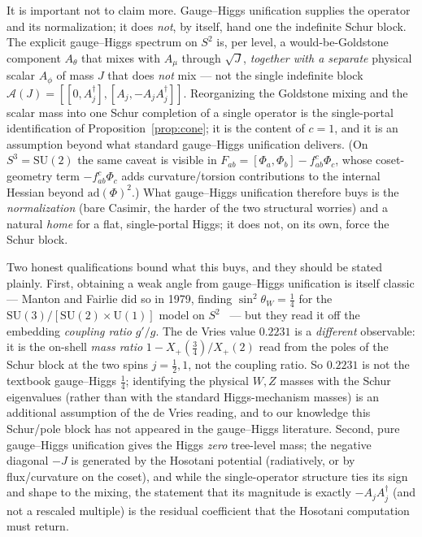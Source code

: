 \documentclass[11pt]{article}
\theoremstyle{plain}
\theoremstyle{definition}
\newcommand{\cA}{\mathcal{A}}
\newcommand{\sinsq}{\sin^{2}\theta_W}
\newcommand{\SU}{\mathrm{SU}}
\newcommand{\U}{\mathrm{U}}
\begin{document}
It is important not to claim more. Gauge--Higgs unification supplies the
operator and its normalization; it does \emph{not}, by itself, hand one the
indefinite Schur block. The explicit gauge--Higgs spectrum on $S^2$ is, per
level, a would-be-Goldstone component $A_\theta$ that mixes with $A_\mu$
through $\sqrt J$, \emph{together with a separate} physical scalar $A_\phi$ of
mass $J$ that does \emph{not} mix --- not the single indefinite block
$\cA(J)=[[0,A_j^\dagger],[A_j,-A_jA_j^\dagger]]$. Reorganizing the Goldstone
mixing and the scalar mass into one Schur completion of a single operator is
the single-portal identification of Proposition~\ref{prop:cone}; it is the
content of $c=1$, and it is an assumption beyond what standard gauge--Higgs
unification delivers. (On $S^3=\SU(2)$ the same caveat is visible in
$F_{ab}=[\Phi_a,\Phi_b]-f^c_{ab}\Phi_c$, whose coset-geometry term
$-f^c_{ab}\Phi_c$ adds curvature/torsion contributions to the internal
Hessian beyond $\mathrm{ad}(\Phi)^2$.) What gauge--Higgs unification therefore
buys is the \emph{normalization} (bare Casimir, the harder of the two
structural worries) and a natural \emph{home} for a flat, single-portal Higgs;
it does not, on its own, force the Schur block.

Two honest qualifications bound what this buys, and they should be stated
plainly. First, obtaining a weak angle from gauge--Higgs unification is itself
classic --- Manton and Fairlie did so in 1979, finding $\sinsq=\tfrac14$ for
the $\SU(3)/[\SU(2)\times\U(1)]$ model on $S^2$~\cite{Manton1979,Fairlie1979}
--- but they read it off the embedding \emph{coupling ratio} $g'/g$. The de
Vries value $0.2231$ is a \emph{different} observable: it is the on-shell
\emph{mass ratio} $1-X_+(\tfrac34)/X_+(2)$ read from the poles of the Schur
block at the two spins $j=\tfrac12,1$, not the coupling ratio. So $0.2231$ is
not the textbook gauge--Higgs $\tfrac14$; identifying the physical $W,Z$ masses
with the Schur eigenvalues (rather than with the standard
Higgs-mechanism masses) is an additional assumption of the de Vries reading,
and to our knowledge this Schur/pole block has not appeared in the
gauge--Higgs literature. Second, pure gauge--Higgs unification gives the Higgs
\emph{zero} tree-level mass; the negative diagonal $-J$ is generated by the
Hosotani potential (radiatively, or by flux/curvature on the coset), and while
the single-operator structure ties its sign and shape to the mixing, the
statement that its magnitude is exactly $-A_jA_j^\dagger$ (and not a rescaled
multiple) is the residual coefficient that the Hosotani computation must
return.
\end{document}
